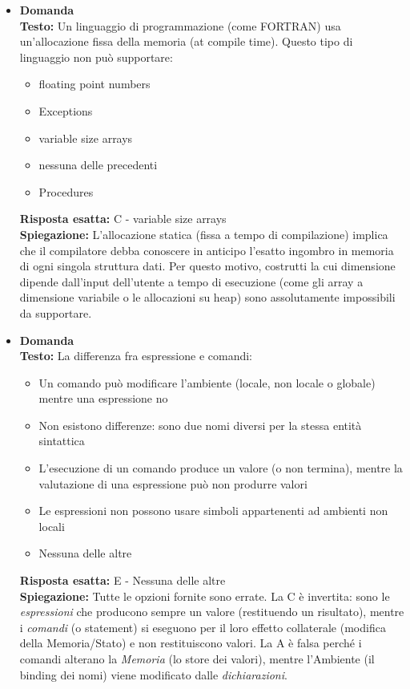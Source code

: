 \documentclass[12pt, a4paper]{article}
\newcounter{domandateoria}
\begin{document}
\begin{itemize}
    \item {}\textbf{Domanda \thedomandateoria} \\
    \textbf{Testo:} Un linguaggio di programmazione (come FORTRAN) usa un'allocazione fissa della memoria (at compile time). Questo tipo di linguaggio non può supportare:
    \begin{itemize}
        \item[A)] floating point numbers
        \item[B)] Exceptions
        \item[C)] variable size arrays
        \item[D)] nessuna delle precedenti
        \item[E)] Procedures
    \end{itemize}
    \textbf{Risposta esatta:} C - variable size arrays \\
    \textbf{Spiegazione:} L'allocazione statica (fissa a tempo di compilazione) implica che il compilatore debba conoscere in anticipo l'esatto ingombro in memoria di ogni singola struttura dati. Per questo motivo, costrutti la cui dimensione dipende dall'input dell'utente a tempo di esecuzione (come gli array a dimensione variabile o le allocazioni su heap) sono assolutamente impossibili da supportare.
    \vspace{0.3cm}

    \item {}\textbf{Domanda \thedomandateoria} \\
    \textbf{Testo:} La differenza fra espressione e comandi:
    \begin{itemize}
        \item[A)] Un comando può modificare l'ambiente (locale, non locale o globale) mentre una espressione no
        \item[B)] Non esistono differenze: sono due nomi diversi per la stessa entità sintattica
        \item[C)] L'esecuzione di un comando produce un valore (o non termina), mentre la valutazione di una espressione può non produrre valori
        \item[D)] Le espressioni non possono usare simboli appartenenti ad ambienti non locali
        \item[E)] Nessuna delle altre
    \end{itemize}
    \textbf{Risposta esatta:} E - Nessuna delle altre \\
    \textbf{Spiegazione:} Tutte le opzioni fornite sono errate. La C è invertita: sono le \textit{espressioni} che producono sempre un valore (restituendo un risultato), mentre i \textit{comandi} (o statement) si eseguono per il loro effetto collaterale (modifica della Memoria/Stato) e non restituiscono valori. La A è falsa perché i comandi alterano la \textit{Memoria} (lo store dei valori), mentre l'Ambiente (il binding dei nomi) viene modificato dalle \textit{dichiarazioni}. 
    \vspace{0.3cm}


\end{itemize}
\end{document}
